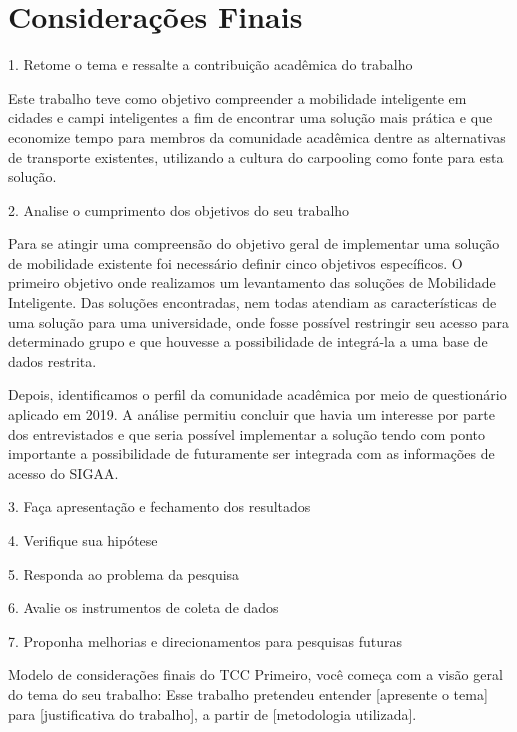 \chapter{Considerações Finais}
\label{chap:Considerações Finais} 
1. Retome o tema e ressalte a contribuição acadêmica do trabalho

Este trabalho teve como objetivo compreender a mobilidade inteligente em cidades e campi inteligentes a fim de encontrar uma solução mais prática e que economize tempo para membros da comunidade acadêmica dentre as alternativas de transporte existentes, utilizando a cultura do carpooling como fonte para esta solução.

2. Analise o cumprimento dos objetivos do seu trabalho

Para se atingir uma compreensão do objetivo geral de implementar uma solução de mobilidade existente foi necessário definir cinco objetivos específicos. O primeiro objetivo onde realizamos um levantamento das soluções de Mobilidade Inteligente. Das soluções encontradas, nem todas atendiam as características de uma solução para uma universidade, onde fosse possível restringir seu acesso para determinado grupo e que houvesse a possibilidade de integrá-la a uma base de dados restrita.

Depois, identificamos o perfil da comunidade acadêmica por meio de questionário aplicado em 2019. A análise permitiu concluir que havia um interesse por parte dos entrevistados e que seria possível implementar a solução tendo com ponto importante a possibilidade de futuramente ser integrada com as informações de acesso do SIGAA.

3. Faça apresentação e fechamento dos resultados

4. Verifique sua hipótese

5. Responda ao problema da pesquisa

6. Avalie os instrumentos de coleta de dados

7. Proponha melhorias e direcionamentos para pesquisas futuras

Modelo de considerações finais do TCC
Primeiro, você começa com a visão geral do tema do seu trabalho:
Esse trabalho pretendeu entender [apresente o tema] para [justificativa do trabalho], a partir de [metodologia utilizada].

